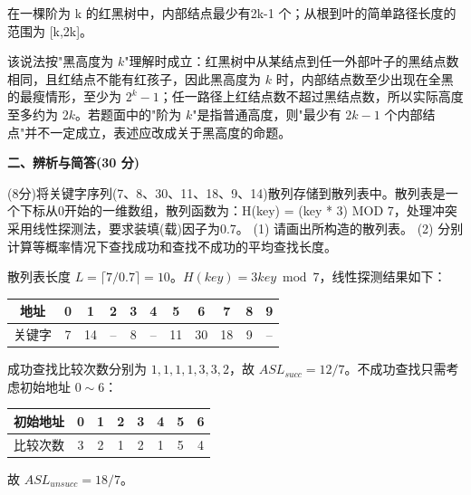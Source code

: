 \begin{question}
在一棵阶为 k 的红黑树中，内部结点最少有2k-1 个；从根到叶的简单路径长度的范围为 [k,2k]。
\begin{solution}
该说法按"黑高度为 $k$"理解时成立：红黑树中从某结点到任一外部叶子的黑结点数相同，且红结点不能有红孩子，因此黑高度为 $k$ 时，内部结点数至少出现在全黑的最瘦情形，至少为 $2^k-1$；任一路径上红结点数不超过黑结点数，所以实际高度至多约为 $2k$。若题面中的"阶为 $k$"是指普通高度，则"最少有 $2k-1$ 个内部结点"并不一定成立，表述应改成关于黑高度的命题。
\end{solution}
\end{question}

\textbf{二、辨析与简答(30 分)}
\begin{question}
(8分)将关键字序列(7、8、30、11、18、9、14)散列存储到散列表中。散列表是一个下标从0开始的一维数组，散列函数为：H(key) = (key * 3) MOD 7，处理冲突采用线性探测法，要求装填(载)因子为0.7。
(1) 请画出所构造的散列表。
(2) 分别计算等概率情况下查找成功和查找不成功的平均查找长度。
\begin{solution}
散列表长度 $L=\lceil 7/0.7\rceil=10$。$H(key)=3key\bmod 7$，线性探测结果如下：
  \begin{center}
  \begin{tabular}{c|cccccccccc}
  地址 &0&1&2&3&4&5&6&7&8&9\\ \hline
  关键字&7&14&--&8&--&11&30&18&9&--
  \end{tabular}
  \end{center}
  成功查找比较次数分别为 $1,1,1,1,3,3,2$，故 $ASL_{succ}=12/7$。不成功查找只需考虑初始地址 $0\sim6$：
  \begin{center}
  \begin{tabular}{c|ccccccc}
  初始地址&0&1&2&3&4&5&6\\ \hline
  比较次数&3&2&1&2&1&5&4
  \end{tabular}
  \end{center}
  故 $ASL_{unsucc}=18/7$。
\end{solution}
\end{question}

